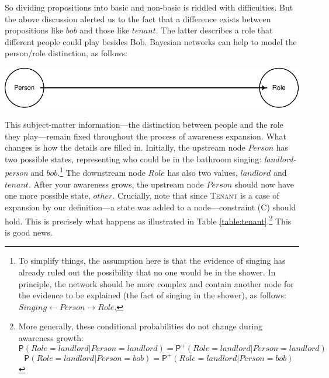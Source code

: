 \documentclass[
  11pt,
  dvipsnames,enabledeprecatedfontcommands]{scrartcl}
\newcommand{\pr}[1]{\ensuremath{\mathsf{P}(#1)}}
\newcommand{\ppr}[2]{\ensuremath{\mathsf{P}^{#1}(#2)}}
\begin{document}
So dividing propositions into basic and non-basic is riddled with
difficulties. But the above discussion alerted us to the fact that a
difference exists between propositions like \(bob\) and those like
\(tenant\). The latter describes a role that different people could play
besides Bob. Bayesian networks can help to model the person/role
distinction, as follows:

\begin{center}\includegraphics[width=0.5\linewidth,height=0.3\textheight]{ReplyToSteeleStefansson5_files/figure-latex/tenantsDAG-new-1} \end{center}

\noindent This subject-matter information---the distinction between
people and the role they play---remain fixed throughout the process of
awareness expansion. What changes is how the details are filled in.
Initially, the upstream node \(Person\) has two possible states,
representing who could be in the bathroom singing:
\textit{landlord-person} and \(bob\).\footnote{To simplify things, the
  assumption here is that the evidence of singing has already ruled out
  the possibility that no one would be in the shower. In principle, the
  network should be more complex and contain another node for the
  evidence to be explained (the fact of singing in the shower), as
  follows:
  \(\textit{Singing}\leftarrow\textit{Person}\rightarrow \textit{Role}\).}
The downstream node \(Role\) has also two values, \(landlord\) and
\(tenant\). After your awareness grows, the upstream node \(Person\)
should now have one more possible state, \(other\). Crucially, note that
since \textsc{Tenant} is a case of expansion by our definition---a state
was added to a node---constraint (C) should hold. This is precisely what
happens as illustrated in Table \ref{table:tenant}.\footnote{More
  generally, these conditional probabilities do not change during
  awareness growth:
  \[\pr{\textit{Role}=\textit{landlord} \vert \textit{Person}=\textit{landlord}}=
  \ppr{+}{\textit{Role}=\textit{landlord} \vert \textit{Person}=\textit{landlord}}\]
  \[\pr{\textit{Role}=\textit{landlord} \vert \textit{Person}=\textit{bob}}=
  \ppr{+}{\textit{Role}=\textit{landlord} \vert \textit{Person}=\textit{bob}}\]}
This is good news.
\end{document}
